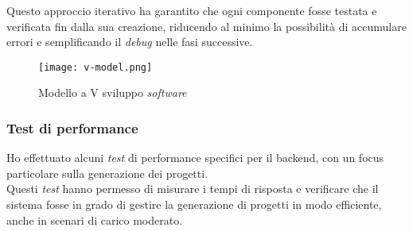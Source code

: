 \noindent Questo approccio iterativo ha garantito che ogni componente fosse testata e verificata fin dalla sua creazione, riducendo al minimo la possibilità di accumulare errori e semplificando il \textit{debug} nelle fasi successive.\\

\begin{figure}[H]
    \centering
    \texttt{[image: v-model.png]}
    \caption{Modello a V sviluppo \textit{software}}
    \label{fig:v-model}  
    \cite{site:v-model}
\end{figure}

\subsubsection{Test di performance}  
Ho effettuato alcuni \textit{test} di performance specifici per il \gls{backend}, con un focus particolare sulla generazione dei progetti.\\
Questi \textit{test} hanno permesso di misurare i tempi di risposta e verificare che il sistema fosse in grado di gestire la generazione di progetti in modo efficiente, anche in scenari di carico moderato.\\
